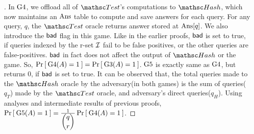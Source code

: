 \begin{proof}[]
In $\text{G4}$, we offload all of $\Test$'s computations to $\Hash$, which now maintains an $\mathrm{Ans}$ table to compute and save answers for each query. For any query, $q$, the $\Test$ oracle returns answer stored at $\mathrm{Ans}[q]$. We also introduce the $\mathsf{bad}$ flag in this game. Like in the earlier proofs,  $\mathsf{bad}$ is set to true, if queries indexed by the r-set ${\cal I}$ fail to be false positives, or the other queries are false-positives. $\mathsf{bad}$ in fact does not affect the output of $\Hash$ or the game. So, $\Pr\left[\: \text{G4}(A) = 1 \:\right] = \Pr\left[\: \text{G3}(A) = 1 \:\right]$. $\text{G5}$ is exactly same as $\text{G4}$, but returns 0, if $\mathsf{bad}$ is set to true. It can be observed that, the total queries made to the $\Hash$ oracle by the adversary(in both games) is the sum of queries($q_T$) made by the $\Test$ oracle, and adversary's direct queries($q_H$). Using analyses and intermediate results of previous proofs, $\Pr\left[\: \text{G5}(A)=1 \:\right] = \frac{1}{\dbinom{q}{r}}\Pr\left[\: \text{G4}(A)=1 \:\right]$.


\end{proof}
